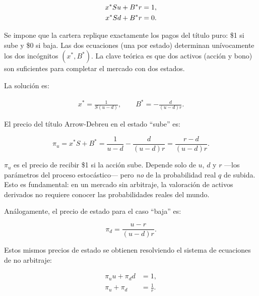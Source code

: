 \documentclass[12pt]{article}
\begin{document}
\begin{align}
  x^* S u + B^* r &= 1, \notag \\
  x^* S d + B^* r &= 0.
  \label{eq:sistbinomial}
\end{align}

\begin{intuicionmat}
Se impone que la cartera replique exactamente los pagos del t\'itulo puro: \$1 si sube y \$0 si baja. Las dos ecuaciones (una por estado) determinan un\'ivocamente los dos inc\'ognitos $(x^*, B^*)$. La clave te\'orica es que dos activos (acci\'on y bono) son suficientes para completar el mercado con dos estados.
\end{intuicionmat}

La soluci\'on es:

\begin{align}
  x^* = \frac{1}{S(u - d)}, \qquad B^* = -\frac{d}{(u - d)r}.
\end{align}

El precio del t\'itulo Arrow-Debreu en el estado ``sube'' es:

\begin{equation}
  \pi_u = x^* S + B^* = \frac{1}{u - d} - \frac{d}{(u - d)r} = \frac{r - d}{(u - d)r}.
  \label{eq:piu}
\end{equation}

\begin{intuicionmat}
$\pi_u$ es el precio de recibir \$1 si la acci\'on sube. Depende solo de $u$, $d$ y $r$ ---los par\'ametros del proceso estoc\'astico--- pero \textit{no} de la probabilidad real $q$ de subida. Esto es fundamental: en un mercado sin arbitraje, la valoraci\'on de activos derivados no requiere conocer las probabilidades reales del mundo.
\end{intuicionmat}

An\'alogamente, el precio de estado para el caso ``baja'' es:

\begin{equation}
  \pi_d = \frac{u - r}{(u - d)r}.
  \label{eq:pid}
\end{equation}

Estos mismos precios de estado se obtienen resolviendo el sistema de ecuaciones de no arbitraje:

\begin{align}
  \pi_u u + \pi_d d &= 1, \label{eq:nabaccion} \\
  \pi_u + \pi_d     &= \frac{1}{r}. \label{eq:nabbono}
\end{align}
\end{document}
